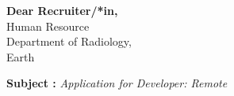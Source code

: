 \documentclass[11pt,A4]{article}
\begin{document}
\pagestyle{fancy}


\vspace{-20.55pt}


\hspace{-0.25\linewidth}\colorbox{bgcol}{}







\vspace{60pt}
{\textbf{Dear Recruiter/*in,}}\\

{Human Resource}\\
{Department of Radiology,}\\
{Earth}\\

\vspace{20pt}
\begin{center}
\textbf{Subject :} \textit{ Application for Developer: Remote  }
\end{center}

\vspace{10pt}
\end{document}
